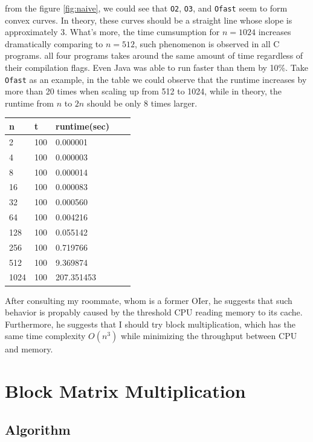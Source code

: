 \documentclass{article}
\begin{document}
from the figure \ref{fig:naive}, we could see that \texttt{O2}, \texttt{O3}, and \texttt{Ofast} seem to form convex curves. In theory, these curves should be a straight line whose slope is approximately 3. What's more, the time cumsumption for \(n=1024\) increases dramatically comparing to \(n=512\), such phenomenon is observed in all C programs. all four programs takes around the same amount of time regardless of their compilation flags. Even Java was able to run faster than them by 10\%. Take \texttt{Ofast} as an example, in the table we could observe that the runtime increases by more than 20 times when scaling up from 512 to 1024, while in theory, the runtime from \(n\) to \(2n\) should be only 8 times larger.
\begin{table}[htbp]
  \centering
  \begin{tabular}{lllll}
  n    & t   & runtime(sec)    &  &  \\
  \hline
  2    & 100 & 0.000001   &  &  \\
  4    & 100 & 0.000003   &  &  \\
  8    & 100 & 0.000014   &  &  \\
  16   & 100 & 0.000083   &  &  \\
  32   & 100 & 0.000560   &  &  \\
  64   & 100 & 0.004216   &  &  \\
  128  & 100 & 0.055142   &  &  \\
  256  & 100 & 0.719766   &  &  \\
  512  & 100 & 9.369874   &  &  \\
  1024 & 100 & 207.351453 &  & 
  \end{tabular}
\end{table}

After consulting my roommate, whom is a former OIer, he suggests that such behavior is propably caused by the threshold CPU reading memory to its cache. Furthermore, he suggests that I should try block multiplication, which has the same time complexity \(O(n^3)\) while minimizing the throughput between CPU and memory.

\section{Block Matrix Multiplication}

\subsection{Algorithm}
\end{document}
